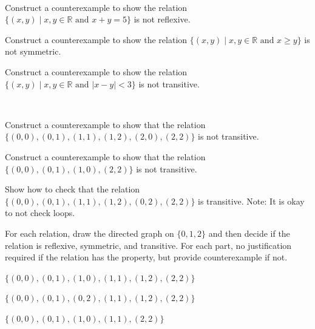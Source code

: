 \begin{exer}[\exerP] %
\label{exer_Cex_rel_on_reals}
~
    \begin{exerpart}
        \item Construct a counterexample to show the relation $\{ (x,y) \mid x, y  \in \mathbb{R} \text{ and } x + y = 5 \}$ is not reflexive.
        \item Construct a counterexample to show the relation $\{ (x,y) \mid x, y  \in \mathbb{R} \text{ and } x \ge y \}$ is not symmetric.
        \item Construct a counterexample to show the relation $\{ (x,y) \mid x, y  \in \mathbb{R} \text{ and } |x - y | < 3 \}$ is not transitive.
    \end{exerpart}
\end{exer}

\begin{exer}[\exerP] %
\label{exer_finite_rel_transitive}
~
    \begin{exerpart}  
        \item Construct a counterexample to show that the relation $\{(0,0), (0,1), (1,1), (1,2), (2,0), (2,2)\}$ is not transitive.
        \item Construct a counterexample to show that the relation $\{(0,0), (0,1), (1,0), (2,2)\}$ is not transitive.
        \item Show how to check that the relation $\{(0,0), (0,1), (1,1), (1,2), (0,2), (2,2)\}$ is transitive.  Note: It is okay to not check loops.
    \end{exerpart}
\end{exer}

\begin{exer}[\exerU] %
\label{exer_ppty_finite_rel}
    For each relation, draw the directed graph on $\{0,1,2\}$ and then decide if the relation is reflexive, symmetric, and transitive.  For each part, no justification required if the relation has the property, but provide counterexample if not.
        \begin{exerpart}
            \item $\{(0,0), (0,1), (1,0), (1,1), (1,2), (2,2)\}$
            \item $\{(0,0), (0,1), (0,2), (1,1), (1,2), (2,2)\}$ %
            \item $\{(0,0), (0,1), (1,0), (1,1), (2,2)\}$ %
        \end{exerpart}
\end{exer}

